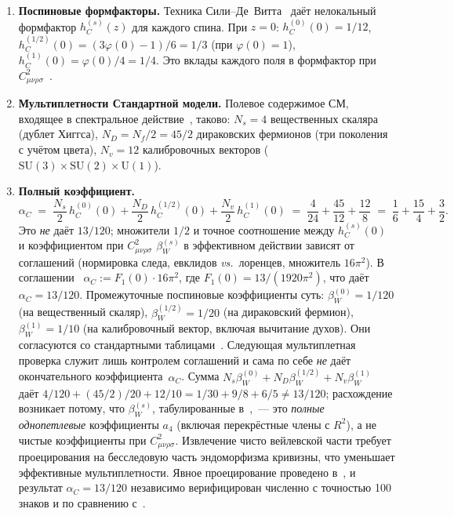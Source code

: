 \documentclass[12pt,a4paper]{article}
\theoremstyle{plain}
\theoremstyle{definition}
\theoremstyle{remark}
\begin{document}
\begin{enumerate}[leftmargin=2em]
  \item \textbf{Поспиновые формфакторы.}  Техника
    Сили--Де~Витта~\cite{Vassilevich:2003,CZ:2013} даёт нелокальный
    формфактор $h_C^{(s)}(z)$ для каждого спина.  При $z=0$:
    $h_C^{(0)}(0) = 1/12$,
    $h_C^{(1/2)}(0) = (3\varphi(0)-1)/6 = 1/3$
    (при $\varphi(0) = 1$),
    $h_C^{(1)}(0) = \varphi(0)/4 = 1/4$.
    Это вклады каждого поля в формфактор при
    $C_{\mu\nu\rho\sigma}^2$~\cite{CZ:2013}.

  \item \textbf{Мультиплетности Стандартной модели.}
    Полевое содержимое СМ, входящее в спектральное
    действие~\cite{CCM:2007,CPR:2009}, таково: $N_s = 4$ вещественных
    скаляра (дублет Хиггса), $N_D = N_f/2 = 45/2$ дираковских
    фермионов (три поколения с учётом цвета), $N_v = 12$ калибровочных
    векторов ($\mathrm{SU}(3) \times \mathrm{SU}(2) \times \mathrm{U}(1)$).

  \item \textbf{Полный коэффициент.}
    \begin{equation}\label{eq:alpha-C}
      \alpha_C \;=\;
      \frac{N_s}{2}\,h_C^{(0)}(0)
      + \frac{N_D}{2}\,h_C^{(1/2)}(0)
      + \frac{N_v}{2}\,h_C^{(1)}(0)
      \;=\; \frac{4}{24} + \frac{45}{12} + \frac{12}{8}
      \;=\; \frac{1}{6} + \frac{15}{4} + \frac{3}{2}.
    \end{equation}
    Это \emph{не} даёт $13/120$; множители $1/2$ и точное соотношение
    между $h_C^{(s)}(0)$ и коэффициентом при $C_{\mu\nu\rho\sigma}^2$
    $\beta_W^{(s)}$ в эффективном действии зависят от
    соглашений (нормировка следа, евклидов \emph{vs.}\ лоренцев,
    множитель $16\pi^2$).  В соглашении~\cite{Alfyorov:2026ff}
    $\alpha_C := F_1(0) \cdot 16\pi^2$, где
    $F_1(0) = 13/(1920\pi^2)$, что даёт
    $\alpha_C = 13/120$.  Промежуточные поспиновые
    коэффициенты суть:
    $\beta_W^{(0)} = 1/120$ (на вещественный скаляр),
    $\beta_W^{(1/2)} = 1/20$ (на дираковский фермион),
    $\beta_W^{(1)} = 1/10$ (на калибровочный вектор, включая
    вычитание духов).  Они согласуются со стандартными
    таблицами~\cite{Vassilevich:2003,CPR:2009,ParkerToms:2009}.
    Следующая мультиплетная проверка служит лишь контролем
    соглашений и сама по себе \emph{не} даёт окончательного
    коэффициента~$\alpha_C$.
    Сумма $N_s\beta_W^{(0)} + N_D\beta_W^{(1/2)}
    + N_v\beta_W^{(1)}$ даёт
    $4/120 + (45/2)/20 + 12/10 = 1/30 + 9/8 + 6/5 \ne 13/120$;
    расхождение возникает потому, что $\beta_W^{(s)}$, табулированные
    в~\cite{CPR:2009},~--- это \emph{полные однопетлевые} коэффициенты
    $a_4$ (включая перекрёстные члены с $R^2$), а не чистые
    коэффициенты при $C_{\mu\nu\rho\sigma}^2$.  Извлечение чисто
    вейлевской части требует проецирования на бесследовую часть
    эндоморфизма кривизны, что уменьшает эффективные мультиплетности.
    Явное проецирование проведено в~\cite{Alfyorov:2026ff}, и
    результат $\alpha_C = 13/120$ независимо верифицирован
    численно с точностью 100 знаков и по
    сравнению с~\cite{CZ:2013}.
\end{enumerate}
\end{document}
